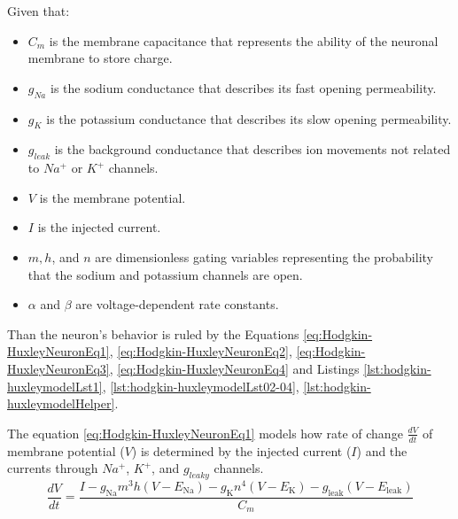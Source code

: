 			\par Given that:
			\begin{itemize}
				\item $C_m$ is the membrane capacitance that represents the ability of the neuronal membrane to store charge.
				\item $g_{Na}$ is the sodium conductance that describes its fast opening permeability.
				\item $g_K$ is the potassium conductance that describes its slow opening permeability.
				\item $g_{leak}$ is the background conductance that describes ion movements not related to $Na^+$ or $K^+$ channels.
				\item $V$ is the membrane potential.
				\item $I$ is the injected current.
				\item $m, h$, and $n$ are dimensionless gating variables representing the probability that the sodium and potassium channels are open.
				\item $\alpha$ and $\beta$ are voltage-dependent rate constants.
			\end{itemize}
		
			\par Than the neuron's behavior is ruled by the Equations \ref{eq:Hodgkin-HuxleyNeuronEq1}, \ref{eq:Hodgkin-HuxleyNeuronEq2}, \ref{eq:Hodgkin-HuxleyNeuronEq3}, \ref{eq:Hodgkin-HuxleyNeuronEq4} and Listings \ref{lst:hodgkin-huxleymodelLst1}, \ref{lst:hodgkin-huxleymodelLst02-04}, \ref{lst:hodgkin-huxleymodelHelper}.\newline
			
			\par The equation \ref{eq:Hodgkin-HuxleyNeuronEq1} models how rate of change $\frac{dV}{dt}$ of membrane potential ($V$) is determined by the injected current ($I$) and the currents through $Na^+$, $K^+$, and $g_{leaky}$ channels.
			\begin{equation}
				\label{eq:Hodgkin-HuxleyNeuronEq1}
				\frac{dV}{dt} = \dfrac{I - g_{\text{Na}}m^3h(V - E_{\text{Na}}) - g_{\text{K}}n^4(V - E_{\text{K}}) - g_{\text{leak}}(V - E_{\text{leak}})}{C_m}
			\end{equation}
			
	
	
	
	
	
